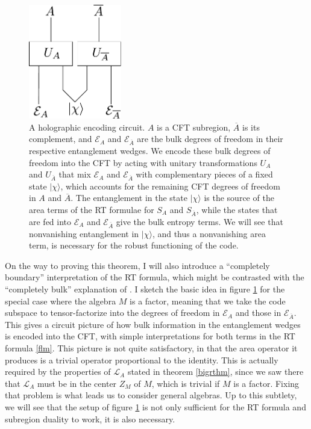 \documentclass[12pt]{article}
\newcommand{\bfig}{\begin{figure}\begin{center}}
\newcommand{\efig}{\end{center}\end{figure}}
\newcommand{\ran}{\rangle}
\newcommand{\Ll}{\mathcal{L}}
\newcommand{\Ab}{\ol{A}}
\newcommand{\LA}{\Ll_A}
\newcommand{\ol}{\overline}
\newcommand{\EA}{\mathcal{E}_A}
\begin{document}
\bfig
\includegraphics[height=5cm]{circuit.pdf}
\caption{A holographic encoding circuit.  $A$ is a CFT subregion, $\Ab$ is its complement, and $\EA$ and $\mathcal{E}_{\Ab}$ are the bulk degrees of freedom in their respective entanglement wedges.  We encode these bulk degrees of freedom into the CFT by acting with unitary transformations $U_A$ and $U_{\Ab}$ that mix $\EA$ and $\mathcal{E}_{\Ab}$ with complementary pieces of a fixed state $|\chi\ran$, which accounts for the remaining CFT degrees of freedom in $A$ and $\Ab$.  The entanglement in the state $|\chi\ran$ is the source of the area terms of the RT formulae for $S_A$ and $S_{\Ab}$, while the states that are fed into $\EA$ and $\mathcal{E}_{\Ab}$ give the bulk entropy terms.  We will see that nonvanishing entanglement in $|\chi\ran$, and thus a nonvanishing area term, is necessary for the robust functioning of the code.}\label{circuit}
\efig
On the way to proving this theorem, I will also introduce a ``completely boundary'' interpretation of the RT formula, which might be contrasted with the ``completely bulk'' explanation of \cite{Lewkowycz:2013nqa,Faulkner:2013ana}.  I sketch the basic idea in figure \ref{circuit} for the special case where the algebra $M$ is a factor, meaning that we take the code subspace to tensor-factorize into the degrees of freedom in $\EA$ and those in $\mathcal{E}_{\Ab}$.  This gives a circuit picture of how bulk information in the entanglement wedges is encoded into the CFT, with simple interpretations for both terms in the RT formula \eqref{flm}.  This picture is not quite satisfactory, in that the area operator it produces is a trivial operator proportional to the identity.  This is actually required by the properties of $\LA$ stated in theorem \ref{bigrthm}, since we saw there that $\LA$ must be in the center $Z_M$ of $M$, which is trivial if $M$ is a factor.  Fixing that problem is what leads us to consider general algebras.  Up to this subtlety, we will see that the setup of figure \ref{circuit} is not only sufficient for the RT formula and subregion duality to work, it is also necessary.  
\end{document}
